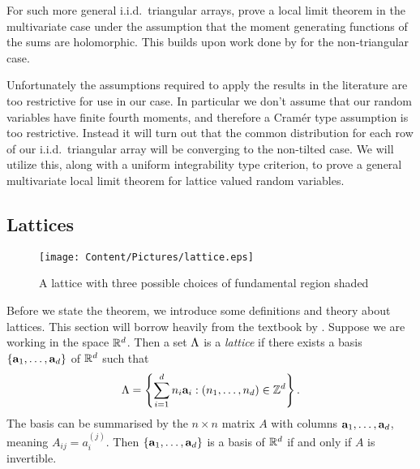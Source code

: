For such more general i.i.d.\ triangular arrays, \citet{chagantyMultidimensionalLargeDeviation1986} prove a local limit theorem in the multivariate case under the assumption that the moment generating functions of the sums are holomorphic. This builds upon work done by \citet{richterLocalLimitTheorems1957,richterMultiDimensionalLocalLimit1958} for the non-triangular case.

Unfortunately the assumptions required to apply the results in the literature are too restrictive for use in our case. In particular we don't assume that our random variables have finite fourth moments, and therefore a Cramér type assumption is too restrictive. Instead it will turn out that the common distribution for each row of our i.i.d.\ triangular array will be converging to the non-tilted case. We will utilize this, along with a uniform integrability type criterion, to prove a general multivariate local limit theorem for lattice valued random variables.

\subsection{Lattices}

\begin{figure}[htbp]
    \centering
    \texttt{[image: Content/Pictures/lattice.eps]}
    \caption{A lattice with three possible choices of fundamental region shaded}
    \label{fig:lattice}
\end{figure}

Before we state the theorem, we introduce some definitions and theory about lattices. This section will borrow heavily from the textbook by \citet{schrijverTheoryLinearInteger1998}. Suppose we are working in the space ${\mathbb R}^d$. Then a set $\Lambda$ is a \emph{lattice} if there exists a basis $\{{\mathbf a}_1, \ldots, {\mathbf a}_d\}$ of ${\mathbb R}^d$ such that
\begin{equation*}
    \Lambda = \left\{ \sum_{i=1}^d n_i {\mathbf a}_i : (n_1, \ldots, n_d) \in {\mathbb Z}^d \right\}.
\end{equation*}
The basis can be summarised by the $n \times n$ matrix $A$ with columns ${\mathbf a}_1, \ldots, {\mathbf a}_d$, meaning $A_{ij} = a_i^{(j)}$. Then $\{{\mathbf a}_1, \ldots, {\mathbf a}_d\}$ is a basis of ${\mathbb R}^d$ if and only if $A$ is invertible. 

